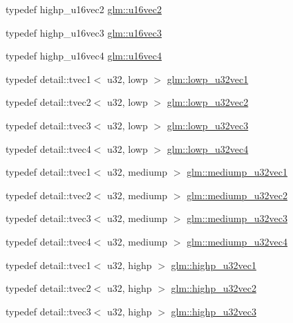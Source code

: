 \begin{DoxyCompactItemize}
typedef highp\+\_\+u16vec2 \hyperlink{group__gtc__type__precision_ga4beac509930099bb494b4bd0a44c49f2}{glm\+::u16vec2}
\item 
typedef highp\+\_\+u16vec3 \hyperlink{group__gtc__type__precision_ga372e1184da616b77fcbd48b8c166c24a}{glm\+::u16vec3}
\item 
typedef highp\+\_\+u16vec4 \hyperlink{group__gtc__type__precision_gaac02cce8820bcdbbeea9659aeaa718fb}{glm\+::u16vec4}
\item 
typedef detail\+::tvec1$<$ u32, lowp $>$ \hyperlink{group__gtc__type__precision_ga579d71c2ae1225b689aaab0bc7d33146}{glm\+::lowp\+\_\+u32vec1}
\item 
typedef detail\+::tvec2$<$ u32, lowp $>$ \hyperlink{group__gtc__type__precision_ga2f588e15c609987b89bd03f50b2a492d}{glm\+::lowp\+\_\+u32vec2}
\item 
typedef detail\+::tvec3$<$ u32, lowp $>$ \hyperlink{group__gtc__type__precision_ga53b6133cd2491fce1445c1744556b1bb}{glm\+::lowp\+\_\+u32vec3}
\item 
typedef detail\+::tvec4$<$ u32, lowp $>$ \hyperlink{group__gtc__type__precision_gaad6408408c9c5321cb6ee54f201de578}{glm\+::lowp\+\_\+u32vec4}
\item 
typedef detail\+::tvec1$<$ u32, mediump $>$ \hyperlink{group__gtc__type__precision_ga323fb0ed8f492d918b087226db2994f3}{glm\+::mediump\+\_\+u32vec1}
\item 
typedef detail\+::tvec2$<$ u32, mediump $>$ \hyperlink{group__gtc__type__precision_ga5d16ea7e110d8ba923ca347c16704f88}{glm\+::mediump\+\_\+u32vec2}
\item 
typedef detail\+::tvec3$<$ u32, mediump $>$ \hyperlink{group__gtc__type__precision_ga84a903ce8834b22f78d80a64eb0181bb}{glm\+::mediump\+\_\+u32vec3}
\item 
typedef detail\+::tvec4$<$ u32, mediump $>$ \hyperlink{group__gtc__type__precision_ga532f59ac4c36a7e1371341165f7be33b}{glm\+::mediump\+\_\+u32vec4}
\item 
typedef detail\+::tvec1$<$ u32, highp $>$ \hyperlink{group__gtc__type__precision_ga8a92d1f79e2fd4a03be803e35aac8e1b}{glm\+::highp\+\_\+u32vec1}
\item 
typedef detail\+::tvec2$<$ u32, highp $>$ \hyperlink{group__gtc__type__precision_gaddb81e8e12bd640e188744ed372c95bb}{glm\+::highp\+\_\+u32vec2}
\item 
typedef detail\+::tvec3$<$ u32, highp $>$ \hyperlink{group__gtc__type__precision_gab1e386f5e415e00f800edf5d15207286}{glm\+::highp\+\_\+u32vec3}
\item 

\end{DoxyCompactItemize}
